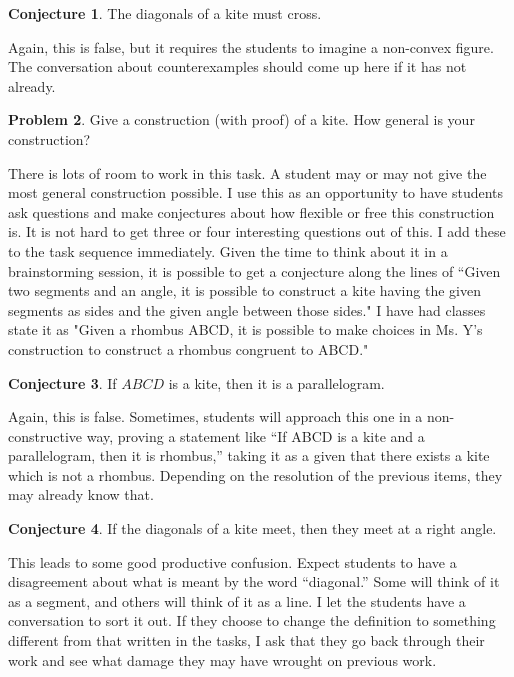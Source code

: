 \documentclass{tufte-handout}
\theoremstyle{definition}
\newtheorem{problem}{Problem}[section]
\newtheorem{conjecture}[problem]{Conjecture}
\begin{document}
\begin{conjecture}
\label{conj:kite-diagonals-cross}
The diagonals of a kite must cross.
\end{conjecture}

Again, this is false, but it requires the students to imagine a non-convex figure. The conversation about counterexamples should come up here if it has not already.

\begin{problem}
\label{prob:construct-kites}
Give a construction (with proof) of a kite.
How general is your construction?
\end{problem}

There is lots of room to work in this task. A student may or may not give the most general construction possible. I use this as an opportunity to have students ask questions and make conjectures about how flexible or free this construction is. It is not hard to get three or four interesting questions out of this. I add these to the task sequence immediately. Given the time to think about it in a brainstorming session, it is possible to get a conjecture along the lines of ``Given two segments and an angle, it is possible to construct a kite having the given segments as sides and the given angle between those sides." I have had classes state it as "Given a rhombus ABCD, it is possible to make choices in Ms. Y's construction to construct a rhombus congruent to ABCD."

\begin{conjecture}
\label{conj:kite-is-parallelogram}
If $ABCD$ is a kite, then it is a parallelogram.
\end{conjecture}

Again, this is false. Sometimes, students will approach this one in a non-constructive way, proving a statement like ``If ABCD is a kite and a parallelogram, then it is rhombus,'' taking it as a given that there exists a kite which is not a rhombus. Depending on the resolution of the 
previous items, they may already know that.


\begin{conjecture}
\label{conj:kite-diagonals-perpendicular}
If the diagonals of a kite meet, then they meet at a right angle.
\end{conjecture}

This leads to some good productive confusion. Expect students to have a disagreement about what is meant by the word ``diagonal.'' Some will think of it as a segment, and others will think of it as a line. I let the students have a conversation to sort it out. If they choose to change the definition to something different from that written in the tasks, I ask that they go back through their work and see what damage they may have wrought on previous work.
\end{document}
